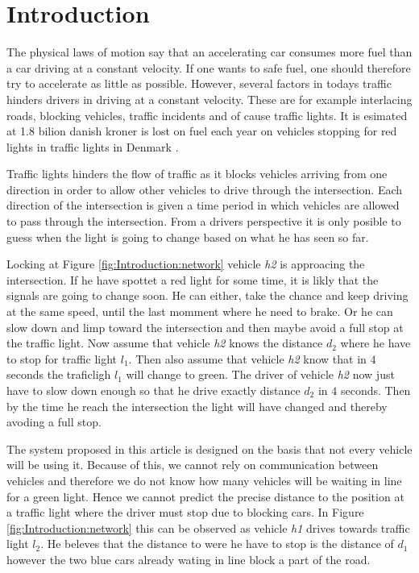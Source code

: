 \section{Introduction}

The physical laws of motion say that an accelerating car consumes more fuel than a car driving at a constant velocity. %
If one wants to safe fuel, one should therefore try to accelerate as little as possible. 
However, several factors in todays traffic hinders drivers in driving at a constant velocity. 
These are for example interlacing roads, blocking vehicles, traffic incidents and of cause traffic lights. 
It is esimated at 1.8 bilion danish kroner is lost on fuel each year on vehicles stopping for red lights in traffic lights in Denmark \cite{Vejdir}.

Traffic lights hinders the flow of traffic as it blocks vehicles arriving from one direction in order to allow other vehicles to drive through the intersection.
Each direction of the intersection is given a time period in which vehicles are allowed to pass through the intersection. 
From a drivers perspective it is only posible to guess when the light is going to change based on what he has seen so far. 

Locking at Figure \ref{fig:Introduction:network} vehicle \textit{h2} is approacing the intersection. If he have spottet a red light for some time, it is likly that the signals are going to change soon. He can either, take the chance and keep driving at the same speed, until the last momment where he need to brake. Or he can slow down and limp toward the intersection and then maybe avoid a full stop at the traffic light. Now assume that vehicle \textit{h2} knows the distance $d_2$ where he have to stop for traffic light $l_1$. Then also assume that vehicle \textit{h2} know that in $4$ seconds the traficligh $l_1$ will change to green. The driver of vehicle \textit{h2} now just have to slow down enough so that he drive exactly distance $d_2$ in $4$ seconds. Then by the time he reach the intersection the light will have changed and thereby avoding a full stop.

The system proposed in this article is designed on the basis that not every vehicle will be using it. 
Because of this, we cannot rely on communication between vehicles and therefore we do not know how many vehicles will be waiting in line for a green light. %
Hence we cannot predict the precise distance to the position at a traffic light where the driver must stop due to blocking cars. In Figure \ref{fig:Introduction:network} this can be observed as vehicle \textit{h1} drives towards traffic light $l_2$. He beleves that the distance to were he have to stop is the distance of $d_1$ however the two blue cars already wating in line block a part of the road.


